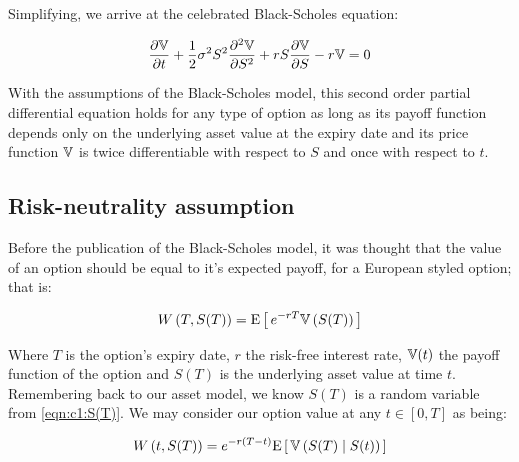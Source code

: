 Simplifying, we arrive at the celebrated Black-Scholes equation:

\begin{equation*}
    \frac{\partial \mathbb{V}}{\partial t} + \frac{1}{2}\sigma^2S^2\frac{\partial^2\mathbb{V}}{\partial S^2} + rS\frac{\partial \mathbb{V}}{\partial S} - r\mathbb{V} = 0
\end{equation*}

With the assumptions of the Black-Scholes model, this second order partial differential equation holds for any type of option as long as its payoff function depends only on the underlying asset value at the expiry date and its price function \(\mathbb{V} \) is twice differentiable with respect to \(S \) and once with respect to \(t \).

\subsection{Risk-neutrality assumption}

Before the publication of the Black-Scholes model, it was thought that the value of an option should be equal to it's expected payoff, for a European styled option; that is:

\begin{equation*}
    W\left(T,S(T)\right) = \text{E}\left[\,e^{-rT}\mathbb{V}\left(S(T)\right)\,\right] 
\end{equation*}

Where \(T\) is the option's expiry date, \(r\) the risk-free interest rate, \(\mathbb{V}(t)\) the payoff function of the option and \(S(T)\) is the underlying asset value at time \(t\). Remembering back to our asset model, we know \(S(T) \) is a random variable from \autoref{eqn:c1:S(T)}. We may consider our option value at any \(t \in [0,T]\) as being:

\begin{equation}\label{eqn:c1:disfpayoff}
    W\left(t,S(T)\right) = e^{-r(T-t)}\text{E}\left[\,\mathbb{V}\left(S(T)\;|\;S(t)\right)\,\right] 
\end{equation}

